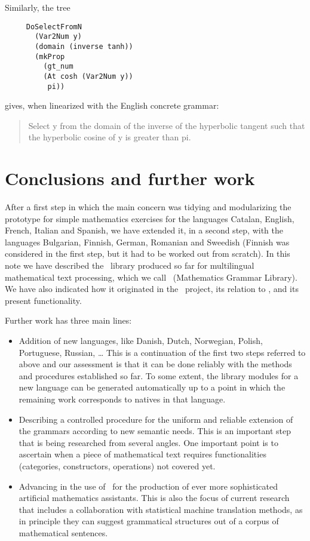 \documentclass[adraft,copyright,creativecommons]{eptcs}
\begin{document}
Similarly, the tree
\begin{lstlisting}
     DoSelectFromN
       (Var2Num y)
       (domain (inverse tanh))
       (mkProp
         (gt_num
         (At cosh (Var2Num y))
          pi))
\end{lstlisting}
gives, when linearized with the English concrete grammar:
\begin{quote}
Select y from the domain of the inverse of the hyperbolic tangent such that
the hyperbolic cosine of y is greater than pi.
\end{quote}



\section{Conclusions and further work}

After a first step in which the main concern was tidying and modularizing
the \webalt{} prototype for simple mathematics exercises for the languages
Catalan,
English,
French,
Italian and
Spanish,
we have extended it, in a second step, with the languages
Bulgarian, Finnish,
German, Romanian and Sweedish
(Finnish was considered in the first step, but it had to be worked out from
scratch).
In this note we have described the \GF\ library produced so far for
multilingual mathematical text processing, which we call
\MGL\ (Mathematics Grammar Library). We have also indicated how it
originated in the \webalt\ project, its relation to \GF, and its
present functionality.

Further work has three main lines:
\begin{itemize}
\item
Addition of new languages,
like Danish, Dutch, Norwegian, Polish, Portuguese, Russian, \ldots
This is a continuation of the first two steps referred to above and
our assessment is that it can be done reliably with the methods and
procedures established so far. To some extent, the library modules for a
new language can be generated automatically up to a point in which the
remaining work corresponds to natives in that language.
\item
Describing a controlled procedure for the uniform and reliable extension
of the grammars according to new semantic needs. This is an important step
that is being researched from several angles. One important point is to
ascertain when a piece of mathematical text requires functionalities
(categories, constructors, operations) not covered yet.
\item
Advancing in the use of \MGL\ for the production of ever more
sophisticated artificial mathematics assistants. This is also the focus of
current research that includes a collaboration with statistical machine
translation methods, as in principle they can suggest grammatical structures
out of a corpus of mathematical sentences.
\end{itemize}


\nocite{*}

%

\end{document}
